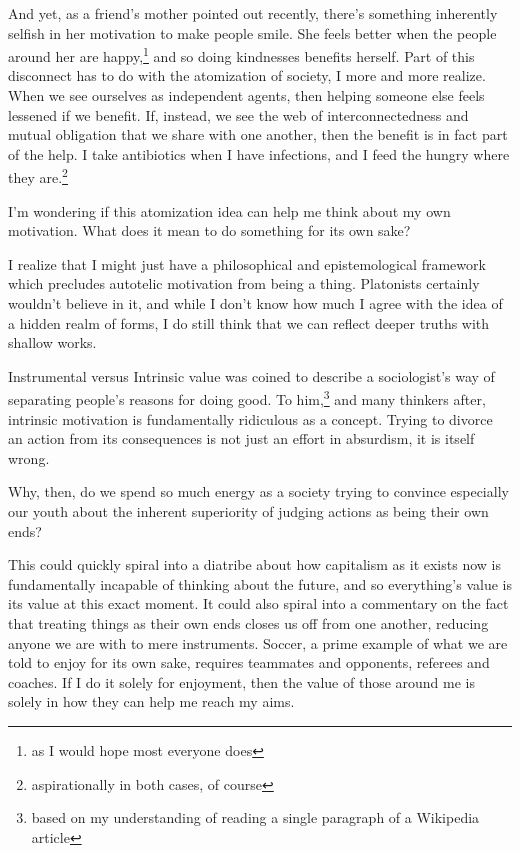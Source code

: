 \documentclass[12pt]{article}
\renewcommand{\,}{\textsuperscript{,}}
\begin{document}
And yet, as a friend's mother pointed out recently, there's something inherently selfish in her motivation to make people smile.  
She feels better when the people around her are happy,\footnote{as I would hope most everyone does} and so doing kindnesses benefits herself.  
Part of this disconnect has to do with the atomization of society, I more and more realize.  
When we see ourselves as independent agents, then helping someone else feels lessened if we benefit.  
If, instead, we see the web of interconnectedness and mutual obligation that we share with one another, then the benefit is in fact part of the help.  
I take antibiotics when I have infections, and I feed the hungry where they are.\footnote{aspirationally in both cases, of course}

I'm wondering if this atomization idea can help me think about my own motivation.  
What does it mean to do something for its own sake?

I realize that I might just have a philosophical and epistemological framework which precludes autotelic motivation from being a thing.  
Platonists certainly wouldn't believe in it, and while I don't know how much I agree with the idea of a hidden realm of forms, I do still think that we can reflect deeper truths with shallow works.

Instrumental versus Intrinsic value was coined to describe a sociologist's way of separating people's reasons for doing good.  
To him,\footnote{based on my understanding of reading a single paragraph of a Wikipedia article} and many thinkers after, intrinsic motivation is fundamentally ridiculous as a concept.  
Trying to divorce an action from its consequences is not just an effort in absurdism, it is itself wrong.

Why, then, do we spend so much energy as a society trying to convince especially our youth about the inherent superiority of judging actions as being their own ends?

This could quickly spiral into a diatribe about how capitalism as it exists now is fundamentally incapable of thinking about the future, and so everything's value is its value at this exact moment.  
It could also spiral into a commentary on the fact that treating things as their own ends closes us off from one another, reducing anyone we are with to mere instruments.  
Soccer, a prime example of what we are told to enjoy for its own sake, requires teammates and opponents, referees and coaches.  
If I do it solely for enjoyment, then the value of those around me is solely in how they can help me reach my aims.
\end{document}
